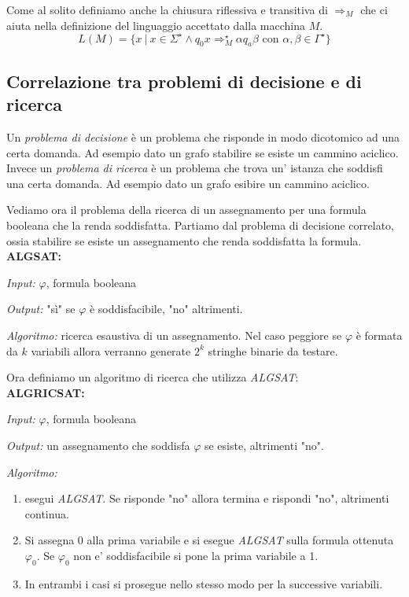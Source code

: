 Come al solito definiamo anche la chiusura riflessiva e transitiva di $\Rightarrow_M$ che ci aiuta nella definizione del linguaggio accettato dalla macchina $M$.
\[
	L(M) = \{ x \ | \ x \in \Sigma^{\star} \land q_0 x \Rightarrow_M^{\star} \alpha q_a\beta \text{ con } \alpha, \beta \in \Gamma^{\star}\}
\]
\subsection{Correlazione tra problemi di decisione e di ricerca}
Un \textit{problema di decisione} è un problema che risponde in modo dicotomico ad una certa domanda. Ad esempio dato un grafo stabilire se esiste un cammino aciclico. Invece un \textit{problema di ricerca} è un problema che trova un' istanza che soddisfi una certa domanda. Ad esempio dato un grafo esibire un cammino aciclico.

Vediamo ora il problema della ricerca di un assegnamento per una formula booleana che la renda soddisfatta. Partiamo dal problema di decisione correlato, ossia stabilire se esiste un assegnamento che renda soddisfatta la formula.
\\

\textbf{ALGSAT:}
\begin{description}
	\item \textit{Input:} $\varphi$, formula booleana
	\item \textit{Output:} "s\`i" se $\varphi$ è soddisfacibile, "no" altrimenti.
	\item \textit{Algoritmo:} ricerca esaustiva di un assegnamento. Nel caso peggiore se $\varphi$ è formata da $k$ variabili allora verranno generate $2^k$ stringhe binarie da testare.
\end{description}
Ora definiamo un algoritmo di ricerca che utilizza \textit{ALGSAT}:
\\

\textbf{ALGRICSAT:}
\begin{description}
	\item \textit{Input:} $\varphi$, formula booleana
	\item \textit{Output:} un assegnamento che soddisfa $\varphi$ se esiste, altrimenti "no".
	\item \textit{Algoritmo:}
		\begin{enumerate}
			\item esegui \textit{ALGSAT}. Se risponde "no" allora termina e rispondi "no", altrimenti continua.
			\item Si assegna 0 alla prima variabile e si esegue \textit{ALGSAT} sulla formula ottenuta $\varphi_0$. Se $\varphi_0$ non e' soddisfacibile si pone la prima variabile a 1.
			\item In entrambi i casi si prosegue nello stesso modo per la successive variabili.
			 
		\end{enumerate}
\end{description}
